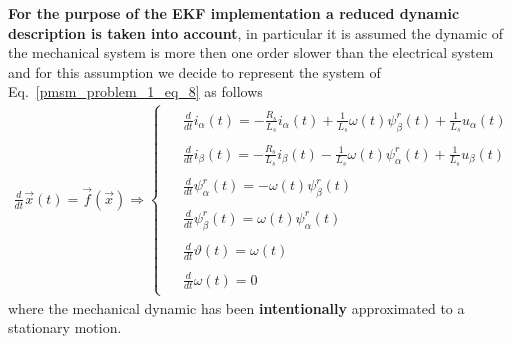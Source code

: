 \documentclass[11pt,a4paper,oneside]{book}
\numberwithin{equation}{section}
\theoremstyle{it}
\theoremstyle{definition}
\begin{document}
\vspace{5mm}
\textbf{For the purpose of the EKF implementation a reduced dynamic description is 
	taken into account}, in particular it is assumed the dynamic of the mechanical 
system is more then one order slower than the electrical system and for this 
assumption we decide to represent the system of Eq.~\eqref{pmsm_problem_1_eq_8} as follows
\begin{align}\label{pmsm_problem_1_eq_9}
	\frac{d}{dt}\vec{x}(t)=\vec{f}(\vec{x})\Rightarrow\left\lbrace 
	\begin{aligned}
		\begin{split}
			&\frac{d}{dt}i_\alpha(t) = -\frac{R_s}{L_s}i_\alpha(t) + 	
			\frac{1}{L_s}\omega(t)\psi_\beta^r(t) + \frac{1}{L_s} u_\alpha(t) 
		\end{split}	\\[6pt]
		\begin{split}
			&\frac{d}{dt}i_\beta(t) = -\frac{R_s}{L_s}i_\beta(t) - 	
			\frac{1}{L_s}\omega(t)\psi_\alpha^r(t) + \frac{1}{L_s} u_\beta(t)	
		\end{split}	\\[6pt]
		\begin{split}
			&\frac{d}{dt}\psi_\alpha^r(t) = -\omega(t)\psi_\beta^r(t)
		\end{split}	\\[6pt]
		\begin{split}	
			&\frac{d}{dt}\psi_\beta^r(t) = \omega(t)\psi_\alpha^r(t)	
		\end{split}	\\[6pt]
		\begin{split}
			&\frac{d}{dt}\vartheta(t) = \omega(t)
		\end{split}	\\[6pt]
		\begin{split}
			&\frac{d}{dt}\omega(t) = 0
		\end{split}
	\end{aligned}\right. 
\end{align}
where the mechanical dynamic has been \textbf{intentionally} approximated to a 
stationary motion.
\end{document}
